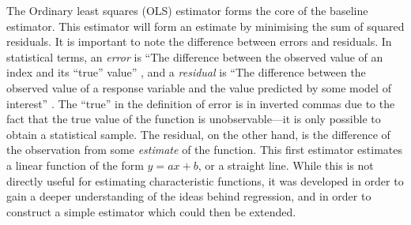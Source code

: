\documentclass[a4paper,11pt]{article}
\begin{document}
The Ordinary least squares (OLS) estimator forms the core of the baseline
estimator. This estimator will form an estimate by minimising the sum of squared
residuals. It is important to note the difference between errors and
residuals. In statistical terms, an \emph{error} is ``The difference between the
observed value of an index and its ``true'' value'' \cite{2008oecd}, and a
\emph{residual} is ``The difference between the observed value of a response
variable and the value predicted by some model of interest''
\cite{everitt2010cambridge}. The ``true'' in the definition of error is in
inverted commas due to the fact that the true value of the function is
unobservable---it is only possible to obtain a statistical sample. The residual,
on the other hand, is the difference of the observation from some
\emph{estimate} of the function. This first estimator estimates a linear
function of the form $y=ax+b$, or a straight line. While this is not directly
useful for estimating characteristic functions, it was developed in order to
gain a deeper understanding of the ideas behind regression, and in order to
construct a simple estimator which could then be extended.
\end{document}
